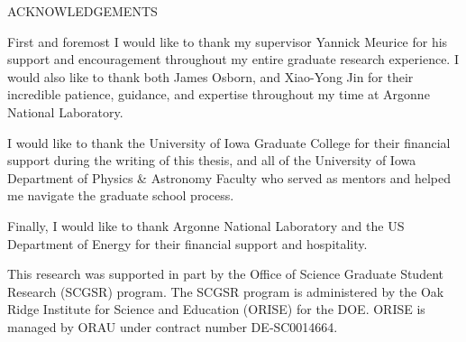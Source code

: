 \begin{doublespace}
\begin{tightcenter}
ACKNOWLEDGEMENTS
\mylinespacing%
\end{tightcenter}

First and foremost I would like to thank my supervisor Yannick Meurice for his  support and encouragement throughout my
entire graduate research experience.
%
I would also like to thank both James Osborn, and Xiao-Yong Jin for their incredible patience, guidance, and expertise
throughout my time at Argonne National Laboratory.

I would like to thank the University of Iowa Graduate College for their financial support during the writing
of this thesis, and all of the University of Iowa Department of Physics \& Astronomy Faculty who served as mentors and
helped me navigate the graduate school process.

Finally, I would like to thank Argonne National Laboratory and the US Department of Energy for their financial support
and hospitality.

This research was supported in part by the Office of Science Graduate Student Research (SCGSR) program. The SCGSR
program is administered by the Oak Ridge Institute for Science and Education (ORISE) for the DOE. ORISE is managed by
ORAU under contract number DE‐SC0014664.



\mylinespacing
\begin{tightcenter}
\myoptpg
\end{tightcenter}
\end{doublespace}
